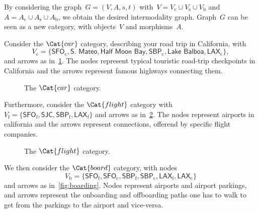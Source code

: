 By considering the graph~$G=(V,A,s,t)$ with~$V=V_\mathrm{c}\cup V_\mathrm{s}\cup V_\mathrm{b}$ and~$A=A_\mathrm{c}\cup A_\mathrm{s}\cup A_\mathrm{b}$, we obtain the desired intermodality graph. Graph~$G$ can be seen as a new category, with objects~$V$ and morphisms~$A$.
\begin{example}
    Consider the $\Cat{car}$ category, describing your road trip in California, with
    \begin{equation*}
        V_\mathrm{c}=\{\textsf{SFO}_\mathrm{c},\textsf{S. Mateo},\textsf{Half Moon Bay},\textsf{SBP}_\mathrm{c},\textsf{Lake Balboa},\textsf{LAX}_\mathrm{c}\},
    \end{equation*}
    and arrows as in~\cref{fig:carcat}. The nodes represent typical touristic road-trip checkpoints in California and the arrows represent famous highways connecting them.

    \begin{figure}[h!]
        \begin{center}
        \end{center}
        \caption{The $\Cat{car}$ category. \label{fig:carcat}}
    \end{figure}

    Furthermore, consider the $\Cat{flight}$ category with $V_\mathrm{f}=\{\textsf{SFO}_\mathrm{f}, \textsf{SJC}, \textsf{SBP}_\mathrm{f}, \textsf{LAX}_\mathrm{f}\}$ and arrows as in~\cref{fig:flight}. The nodes represent airports in california and the arrows represent connections, offerend by specific flight companies.

    \begin{figure}[h!]
        \begin{center}
        \end{center}
        \caption{The $\Cat{flight}$ category. \label{fig:flight}}
    \end{figure}

    We then consider the $\Cat{board}$ category, with nodes
    \begin{equation*}
        V_\mathrm{b}=\{\textsf{SFO}_\mathrm{f},\textsf{SFO}_\mathrm{c},\textsf{SBP}_\mathrm{f},\textsf{SBP}_\mathrm{c},\textsf{LAX}_\mathrm{f},\textsf{LAX}_\mathrm{c}\}
    \end{equation*}
    and arrows as in~\cref{fig:boarding}. Nodes represent airports and airport parkings, and arrows represent the onboarding and offboarding paths one has to walk to get from the parkings to the airport and vice-versa.


\end{example}
